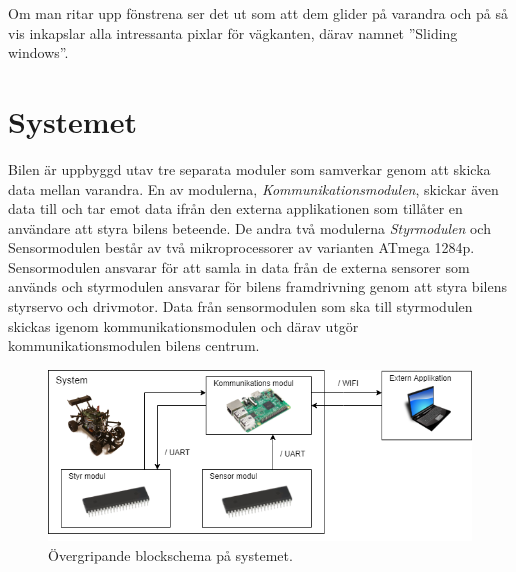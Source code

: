 \documentclass[10pt,oneside,swedish]{lips}
\begin{document}
\noindent
Om man ritar upp fönstrena ser det ut som att dem glider på varandra och på så vis inkapslar alla intressanta pixlar för vägkanten, därav namnet ''Sliding windows''.

\pagebreak

\section{Systemet}
\label{sec:systemet}
Bilen är uppbyggd utav tre separata moduler som samverkar genom att skicka data mellan varandra. En av modulerna, \emph{Kommunikationsmodulen}, skickar även data till och tar emot data ifrån den externa applikationen som tillåter en användare att styra bilens beteende. De andra två modulerna \emph{Styrmodulen} och \emph{}{Sensormodulen} består av två  mikroprocessorer av varianten ATmega 1284p. \\
Sensormodulen ansvarar för att samla in data från de externa sensorer som används och styrmodulen ansvarar för bilens framdrivning genom att styra bilens styrservo och drivmotor.
Data från sensormodulen som ska till styrmodulen skickas igenom kommunikationsmodulen och därav utgör kommunikationsmodulen bilens centrum.

\begin{figure}[H]%
  \centering
  \includegraphics[width=.7\textwidth]{../Figures/tekdok-overview.png}
  \caption{Övergripande blockschema på systemet.}
  \label{fig:system-overview}
\end{figure}
\end{document}
